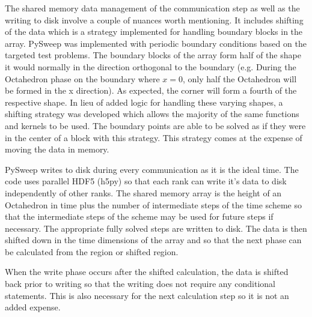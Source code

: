 \documentclass[review]{elsarticle}
\begin{document}
\par The shared memory data management of the communication step as well as the writing to disk involve a couple of nuances worth mentioning. It includes shifting of the data which is a strategy implemented for handling boundary blocks in the array. PySweep was implemented with periodic boundary conditions based on the targeted test problems. The boundary blocks of the array form half of the shape it would normally in the direction orthogonal to the boundary (e.g. During the Octahedron phase on the boundary where $x=0$, only half the Octahedron will be formed in the x direction). As expected, the corner will form a fourth of the respective shape. In lieu of added logic for handling these varying shapes, a shifting strategy was developed which allows the majority of the same functions and kernels to be used. The boundary points are able to be solved as if they were in the center of a block with this strategy. This strategy comes at the expense of moving the data in memory.

\par PySweep writes to disk during every communication as it is the ideal time. The code uses parallel HDF5 (h5py) so that each rank can write it's data to disk independently of other ranks. The shared memory array is the height of an Octahedron in time plus the number of intermediate steps of the time scheme so that the intermediate steps of the scheme may be used for future steps if necessary. The appropriate fully solved steps are written to disk. The data is then shifted down in the time dimensions of the array and so that the next phase can be calculated from the region or shifted region. 

When the write phase occurs after the shifted calculation, the data is shifted back prior to writing so that the writing does not require any conditional statements. This is also necessary for the next calculation step so it is not an added expense.
\end{document}
